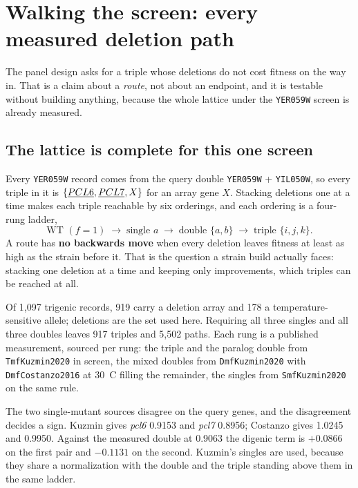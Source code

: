 
\section{Walking the screen: every measured deletion path}

The panel design asks for a triple whose deletions do not cost fitness on the way
in. That is a claim about a \emph{route}, not about an endpoint, and it is
testable without building anything, because the whole lattice under the
\texttt{YER059W} screen is already measured.

\subsection{The lattice is complete for this one screen}

Every \texttt{YER059W} record comes from the query double \texttt{YER059W} +
\texttt{YIL050W}, so every triple in it is $\{\emph{PCL6}, \emph{PCL7}, X\}$ for
an array gene $X$. Stacking deletions one at a time makes each triple reachable
by six orderings, and each ordering is a four-rung ladder,
\[
\text{WT } (f = 1) \;\longrightarrow\; \text{single } a \;\longrightarrow\;
\text{double } \{a,b\} \;\longrightarrow\; \text{triple } \{i,j,k\}.
\]
A route has \textbf{no backwards move} when every deletion leaves fitness at
least as high as the strain before it. That is the question a strain build
actually faces: stacking one deletion at a time and keeping only improvements,
which triples can be reached at all.

Of 1{,}097 trigenic records, 919 carry a deletion array and 178 a
temperature-sensitive allele; deletions are the set used here. Requiring all
three singles and all three doubles leaves 917 triples and 5{,}502 paths. Each
rung is a published measurement, sourced per rung: the triple and the paralog
double from \texttt{TmfKuzmin2020} in screen, the mixed doubles from
\texttt{DmfKuzmin2020} with \texttt{DmfCostanzo2016} at 30~C filling the
remainder, the singles from \texttt{SmfKuzmin2020} on the same rule.

The two single-mutant sources disagree on the query genes, and the disagreement
decides a sign. Kuzmin gives \emph{pcl6} 0.9153 and \emph{pcl7} 0.8956; Costanzo
gives 1.0245 and 0.9950. Against the measured double at 0.9063 the digenic term
is $+0.0866$ on the first pair and $-0.1131$ on the second. Kuzmin's singles are
used, because they share a normalization with the double and the triple standing
above them in the same ladder.

